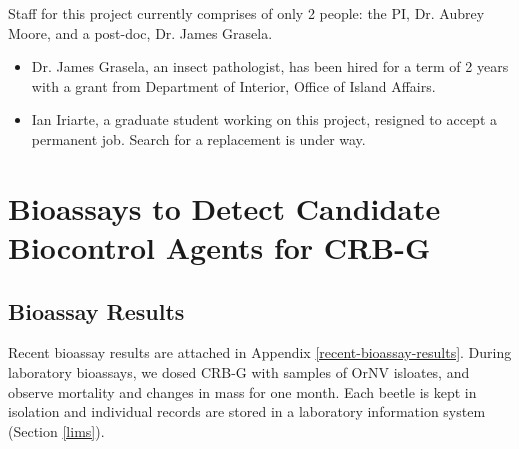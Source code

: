 \documentclass[12pt,letterpaper,english,bibliography=totocnumbered]{scrartcl}
\begin{document}
Staff for this project currently comprises of only 2 people: the PI, Dr. Aubrey Moore, and a post-doc, Dr. James Grasela.
\begin{itemize}

    \item Dr. James Grasela, an insect pathologist, has been hired for a term of 2 years with a grant from Department of Interior, Office of Island Affairs.

    \item Ian Iriarte, a graduate student working on this project, resigned to accept a permanent job. Search for a replacement is under way.

\end{itemize}





\section{Bioassays to Detect Candidate Biocontrol Agents for CRB-G}





\subsection{Bioassay Results}

Recent bioassay results are attached in Appendix \ref{recent-bioassay-results}.
During laboratory bioassays, we dosed CRB-G with samples of OrNV isloates, and observe mortality and changes in mass for one month. Each beetle is kept in isolation and individual records are stored in a laboratory information system (Section \ref{lims}).
\end{document}
